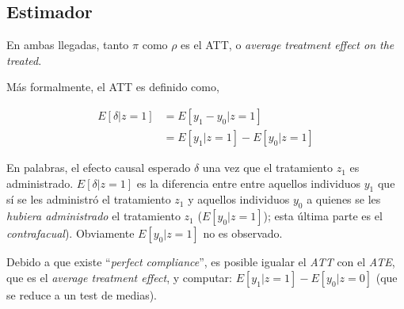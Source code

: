 \documentclass[10pt]{article}
\begin{document}
\subsection*{Estimador}

En ambas llegadas, tanto $\pi$ como $\rho$ es el ATT, o \emph{average treatment effect on the treated}.

M\'as formalmente, el ATT es definido como,

\begin{equation} \label{att}
\begin{split}
E[\delta | z = 1] &= E[y_{1} - y_{0} | z = 1] \\
                 &= E[y_{1} | z = 1] - E[y_{0} | z = 1]
\end{split}
\end{equation}

En palabras, el efecto causal esperado $\delta$ una vez que el tratamiento $z_{1}$ es administrado. $E[\delta | z = 1]$ es la diferencia entre entre aquellos individuos $y_{1}$ que s\'i se les administr\'o el tratamiento $z_{1}$ y aquellos individuos $y_{0}$ a quienes se les \emph{hubiera administrado} el tratamiento $z_{1}$ ($E[y_{0} | z = 1]$); esta \'ultima parte es el \emph{contrafacual}). Obviamente $E[y_{0} | z = 1]$ no es observado. 

Debido a que existe ``\emph{perfect compliance}'', es posible igualar el \emph{ATT} con el \emph{ATE}, que es el \emph{average treatment effect}, y computar: $E[y_{1}|z=1]-E[y_{0}|z=0]$ (que se reduce a un test de medias).
\end{document}
